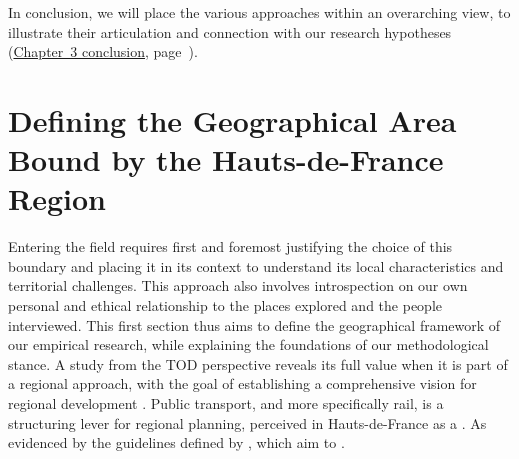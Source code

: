 \begin{refsegment}
In conclusion, we will place the various approaches within an overarching view, to illustrate their articulation and connection with our research hypotheses (\hyperref[chap3:conclusion]{Chapter~3 conclusion}, page~\pageref{chap3:conclusion}).%

    \newpage
\section{Defining the Geographical Area Bound by the Hauts-de-France Region
    \label{chap3:region-hauts-de-france}
    }

Entering the field requires first and foremost justifying the choice of this boundary and placing it in its context to understand its local characteristics and territorial challenges. This approach also involves introspection on our own personal and ethical relationship to the places explored and the people interviewed. This first section thus aims to define the geographical framework of our empirical research, while explaining the foundations of our methodological stance. A study from the \acrshort{TOD} perspective reveals its full value when it is part of a regional approach, with the goal of establishing a comprehensive vision for regional development \textcolor{blue}{\autocite[24]{lo_feudo_scenario_2014}}. Public transport, and more specifically rail, is a structuring lever for regional planning, perceived in Hauts-de-France as a  \textcolor{blue}{\autocite[147, 163]{baron_reseaux_2017}}. As evidenced by the guidelines defined by \textcolor{blue}{\textcite[17]{region_hauts-de-france_planification_2024}}, which aim to .%


\end{refsegment}
